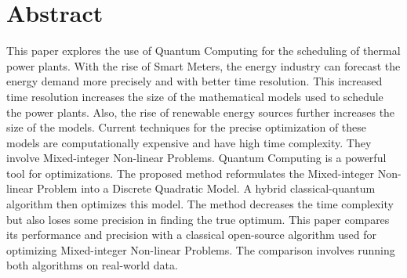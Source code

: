 \chapter*{Abstract}

This paper explores the use of Quantum Computing for the scheduling of thermal power plants.
With the rise of Smart Meters, the energy industry can forecast the energy demand more precisely and with better time resolution.
This increased time resolution increases the size of the mathematical models used to schedule the power plants.
Also, the rise of renewable energy sources further increases the size of the models.
Current techniques for the precise optimization of these models are computationally expensive and have high time complexity.
They involve Mixed-integer Non-linear Problems.
Quantum Computing is a powerful tool for optimizations.
The proposed method reformulates the Mixed-integer Non-linear Problem into a Discrete Quadratic Model.
A hybrid classical-quantum algorithm then optimizes this model.
The method decreases the time complexity but also loses some precision in finding the true optimum.
This paper compares its performance and precision with a classical open-source algorithm used for optimizing Mixed-integer Non-linear Problems.
The comparison involves running both algorithms on real-world data.
